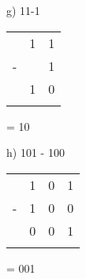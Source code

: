 \begin{figure}[H]
    \begin{minipage}[t]{0.45\textwidth}
        g) 11-1
        \begin{table}[H]
            \centering
            \begin{tabularx}{0.5\linewidth}{rXX}
                & 1 & 1\\
                - &  & 1\\
                \cline{2-3}
                & 1 & 0 \\
                \cline{2-3}
                &  &
            \end{tabularx}
        \end{table}
        = 10
    \end{minipage}\hfill
    \begin{minipage}[t]{0.45\textwidth}
        h) 101 - 100
        \begin{table}[H]
            \centering
            \begin{tabularx}{0.5\linewidth}{rXXX}
                & 1 & 0 & 1 \\
                - & 1 & 0 & 0\\
                \cline{2-4}
                & 0 & 0 & 1 \\
                \cline{2-4}
                &  & & 
            \end{tabularx}
        \end{table}
        = 001
    \end{minipage}\hfill
\end{figure}

